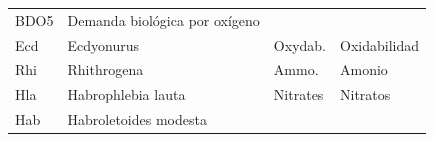 \documentclass[
  spanish,
]{article}
\begin{document}
\begin{longtable}[]{@{}llll@{}}
\begin{minipage}[t]{0.14\columnwidth}
BDO5\strut
\end{minipage} & \begin{minipage}[t]{0.35\columnwidth}\raggedright
Demanda biológica por oxígeno\strut
\end{minipage}\tabularnewline
\begin{minipage}[t]{0.12\columnwidth}\raggedright
Ecd\strut
\end{minipage} & \begin{minipage}[t]{0.27\columnwidth}\raggedright
Ecdyonurus\strut
\end{minipage} & \begin{minipage}[t]{0.14\columnwidth}\raggedright
Oxydab.\strut
\end{minipage} & \begin{minipage}[t]{0.35\columnwidth}\raggedright
Oxidabilidad\strut
\end{minipage}\tabularnewline
\begin{minipage}[t]{0.12\columnwidth}\raggedright
Rhi\strut
\end{minipage} & \begin{minipage}[t]{0.27\columnwidth}\raggedright
Rhithrogena\strut
\end{minipage} & \begin{minipage}[t]{0.14\columnwidth}\raggedright
Ammo.\strut
\end{minipage} & \begin{minipage}[t]{0.35\columnwidth}\raggedright
Amonio\strut
\end{minipage}\tabularnewline
\begin{minipage}[t]{0.12\columnwidth}\raggedright
Hla\strut
\end{minipage} & \begin{minipage}[t]{0.27\columnwidth}\raggedright
Habrophlebia lauta\strut
\end{minipage} & \begin{minipage}[t]{0.14\columnwidth}\raggedright
Nitrates\strut
\end{minipage} & \begin{minipage}[t]{0.35\columnwidth}\raggedright
Nitratos\strut
\end{minipage}\tabularnewline
\begin{minipage}[t]{0.12\columnwidth}\raggedright
Hab\strut
\end{minipage} & \begin{minipage}[t]{0.27\columnwidth}\raggedright
Habroletoides modesta\strut
\end{minipage} & \begin{minipage}[t]{0.14\columnwidth}\raggedright

\end{minipage}
\end{longtable}
\end{document}
